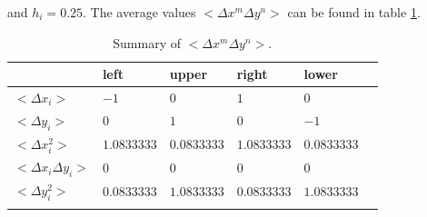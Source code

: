 \documentclass[review]{elsarticle}
\begin{document}
and $h_i=0.25$. The average values $<\Delta x^m\Delta y^n>$ can be found in table \ref{tab:avgj}.
	\begin{table}[!htp]
		\centering
		\caption{\label{tab:avgj} Summary of $<\Delta x^m\Delta y^n>$.}
		\begin{threeparttable}
			\begin{tabular}{p{60pt} p{100pt}<{\centering} p{80pt}<{\centering} p{80pt}<{\centering} p{80pt}<{\centering} p{80pt}<{\centering}}
				\hline
				\hline
				& left & upper & right & lower \\
				\hline
				$<\Delta x_i>$ & $-1$ & $0$ & $1$ & $0$ \\
				
				$<\Delta y_i>$ & $0$ & $1$ & $0$ & $-1$\\
				
				$<\Delta x^2_i>$ & $1.0833333$ & $0.0833333$ & $1.0833333$ & $0.0833333$\\
				
				$<\Delta x_i\Delta y_i>$ & $0$ & $0$ & $0$ & $0$\\
				
				$<\Delta y^2_i>$ & $0.0833333$ & $1.0833333$ & $0.0833333$ & $1.0833333$\\
				\lasthline
			\end{tabular}
		\end{threeparttable}
	\end{table}
\end{document}
